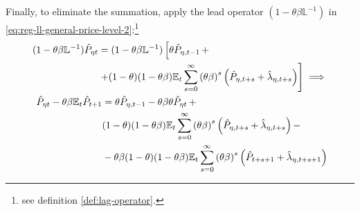 \documentclass[../thesis.tex]{subfiles}
\begin{document}
Finally, to eliminate the summation, apply the lead operator $(1- \theta \beta \mathbb{L}^{-1})$ in \ref{eq:reg-ll-general-price-level-2}:\footnote{see definition \ref{def:lag-operator}.}
\begin{align}
	\begin{split}
		(1- \theta \beta \mathbb{L}^{-1}) \hat{P}_{\eta t} &= (1- \theta \beta \mathbb{L}^{-1}) \left[ \theta \hat{P}_{\eta, t-1} \, + \right. \\
		&\left. + (1-\theta) (1- \theta \beta) {\mathbb{E}_{t}} \sum_{s=0}^{\infty} \left( \theta \beta \right)^s \left( \hat{P}_{\eta, t+s} + \hat{\lambda}_{\eta, t+s} \right) \right] \implies \nonumber
	\end{split} \\
	\begin{split}
		\hat{P}_{\eta t} - \theta \beta {\mathbb{E}_{t}} \hat{P}_{t+1} &= \theta \hat{P}_{\eta, t-1} - \theta \beta \theta \hat{P}_{\eta t} \, + \\
		& (1-\theta) (1- \theta \beta) {\mathbb{E}_{t}} \sum_{s=0}^{\infty} \left( \theta \beta \right)^s \left( \hat{P}_{\eta, t+s} + \hat{\lambda}_{\eta, t+s} \right) - \\
		& - \theta \beta (1-\theta) (1- \theta \beta) {\mathbb{E}_{t}} \sum_{s=0}^{\infty} \left( \theta \beta \right)^s \left( \hat{P}_{t+s+1} + \hat{\lambda}_{\eta, t+s+1} \right)
	\end{split} \label{eq:reg-ll-general-price-level-3}
\end{align}
\end{document}
